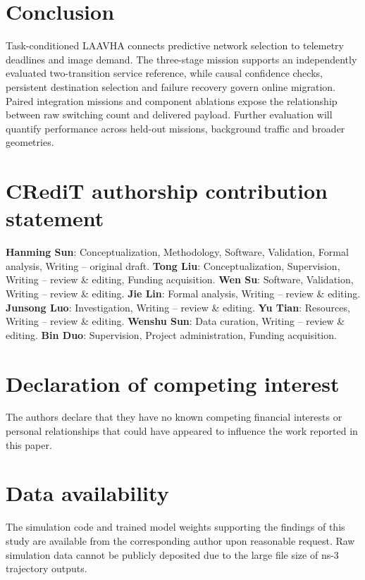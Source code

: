 \documentclass[preprint,12pt]{elsarticle}
\begin{document}
\section{Conclusion}\label{sec:conclusion}
Task-conditioned LAAVHA connects predictive network selection to telemetry deadlines and image demand. The three-stage mission supports an independently evaluated two-transition service reference, while causal confidence checks, persistent destination selection and failure recovery govern online migration. Paired integration missions and component ablations expose the relationship between raw switching count and delivered payload. Further evaluation will quantify performance across held-out missions, background traffic and broader geometries.

\section*{CRediT authorship contribution statement}

\textbf{Hanming Sun}: Conceptualization, Methodology, Software, Validation, Formal analysis, Writing -- original draft.
\textbf{Tong Liu}: Conceptualization, Supervision, Writing -- review \& editing, Funding acquisition.
\textbf{Wen Su}: Software, Validation, Writing -- review \& editing.
\textbf{Jie Lin}: Formal analysis, Writing -- review \& editing.
\textbf{Junsong Luo}: Investigation, Writing -- review \& editing.
\textbf{Yu Tian}: Resources, Writing -- review \& editing.
\textbf{Wenshu Sun}: Data curation, Writing -- review \& editing.
\textbf{Bin Duo}: Supervision, Project administration, Funding acquisition.

\section*{Declaration of competing interest}

The authors declare that they have no known competing financial interests or personal relationships that could have appeared to influence the work reported in this paper.

\section*{Data availability}

The simulation code and trained model weights supporting the findings of this study are available from the corresponding author upon reasonable request. Raw simulation data cannot be publicly deposited due to the large file size of ns-3 trajectory outputs.
\end{document}
